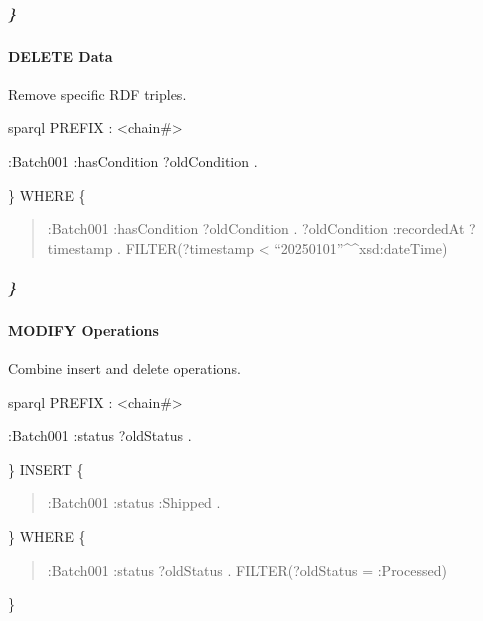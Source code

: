 \documentclass[letterpaper,10pt,english]{sphinxmanual}
\begin{document}
\subparagraph{\}}
\label{\detokenize{api/sparql-api:id115}}

\paragraph{DELETE Data}
\label{\detokenize{api/sparql-api:delete-data}}
\sphinxAtStartPar
Remove specific RDF triples.

\sphinxAtStartPar
{}
{\color{red}\bfseries{}\textasciigrave{}\textasciigrave{}}{\color{red}\bfseries{}\textasciigrave{}}sparql
PREFIX : \textless{}\sphinxhyphen{}chain\#\textgreater{}
\begin{description}
\sphinxAtStartPar
:Batch001 :hasCondition ?oldCondition .

\end{description}

\sphinxAtStartPar
\}
WHERE \{
\begin{quote}

\sphinxAtStartPar
:Batch001 :hasCondition ?oldCondition .
?oldCondition :recordedAt ?timestamp .
FILTER(?timestamp \textless{} “2025\sphinxhyphen{}01\sphinxhyphen{}01”\textasciicircum{}\textasciicircum{}xsd:dateTime)
\end{quote}


\subparagraph{\}}
\label{\detokenize{api/sparql-api:id120}}

\paragraph{MODIFY Operations}
\label{\detokenize{api/sparql-api:modify-operations}}
\sphinxAtStartPar
Combine insert and delete operations.

\sphinxAtStartPar
{}
{\color{red}\bfseries{}\textasciigrave{}\textasciigrave{}}{\color{red}\bfseries{}\textasciigrave{}}sparql
PREFIX : \textless{}\sphinxhyphen{}chain\#\textgreater{}
\begin{description}
\begin{description}
\sphinxAtStartPar
:Batch001 :status ?oldStatus .

\end{description}

\sphinxAtStartPar
\}
INSERT \{
\begin{quote}

\sphinxAtStartPar
:Batch001 :status :Shipped .
\end{quote}

\sphinxAtStartPar
\}
WHERE \{
\begin{quote}

\sphinxAtStartPar
:Batch001 :status ?oldStatus .
FILTER(?oldStatus = :Processed)
\end{quote}

\sphinxAtStartPar
\}

\end{description}
\end{document}

